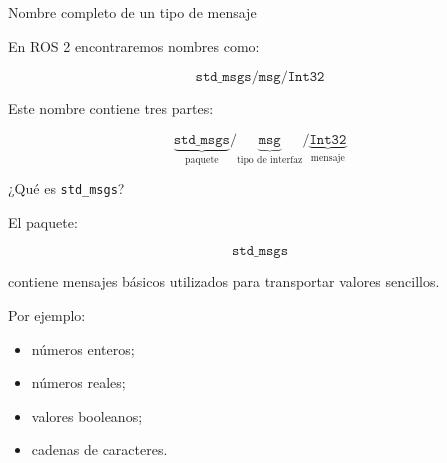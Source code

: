 \documentclass[aspectratio=169]{beamer}
\begin{document}
\begin{frame}{Nombre completo de un tipo de mensaje}

    En ROS 2 encontraremos nombres como:

    \[
    \boxed{
        \texttt{std\_msgs/msg/Int32}
    }
    \]

    Este nombre contiene tres partes:

    \[
    \underbrace{\texttt{std\_msgs}}_{\text{paquete}}
    /
    \underbrace{\texttt{msg}}_{\text{tipo de interfaz}}
    /
    \underbrace{\texttt{Int32}}_{\text{mensaje}}
    \]

    \vspace{0.3cm}


\end{frame}

\begin{frame}{¿Qué es \texorpdfstring{\texttt{std\_msgs}}{std msgs}?}

    El paquete:

    \[
    \texttt{std\_msgs}
    \]

    contiene mensajes básicos utilizados para transportar valores sencillos.

    Por ejemplo:

    \begin{itemize}
        \item números enteros;
        \item números reales;
        \item valores booleanos;
        \item cadenas de caracteres.
    \end{itemize}

    \vspace{0.3cm}


\end{frame}
\end{document}
